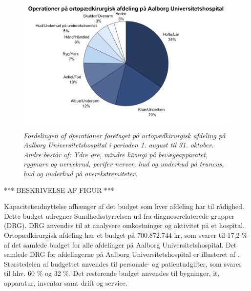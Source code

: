 \begin{figure}[H]
	\flushleft 
	\centering
	\includegraphics[scale=0.45]{figures/operationsdiagram.png}
	\flushleft
	\caption{\textit{Fordelingen af operationer foretaget på ortopædkirurgisk afdeling på Aalborg Universitetshospital i perioden 1. august til 31. oktober. Andre består af: Ydre øre, mindre kirurgi på bevægeapparatet, rygmarv og nervebrud, perifer nerver, hud og underhud på truncus, hud og underhud på overekstremiteter.}}
	\label{operationstype}
\end{figure}

*** BESKRIVELSE AF FIGUR ***


Kapacitetsudnyttelse afhænger af det budget som hver afdeling har til rådighed. Dette budget udregner Sundhedsstyrrelsen ud fra diagnoserelaterede grupper (DRG). DRG anvendes til at analysere omkostninger og aktivitet på et hospital.\cite{DRG2016} Ortopædkirurgisk afdeling har et budget på $700.872.744$ kr, som svarer til 17,2 \% af det samlede budget for alle afdelinger på Aalborg Universitetshospital. Det samlede DRG for afdelingerne på Aalborg Universitetshospital er illusteret af .\cite{Rasmussen2016}
Størstedelen af budgettet anvendes til personale- og patientudgifter, som svarer til hhv. 60 \% og 32 \%. Det resterende budget anvendes til bygninger, it, apparatur, inventar samt drift og service\cite{Noegletal2016}. 


